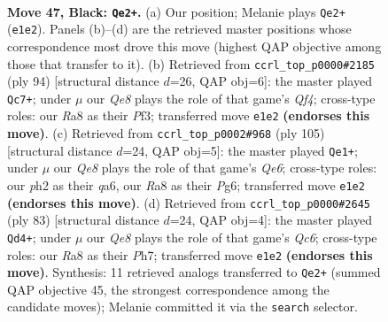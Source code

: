 \documentclass[11pt]{article}
\begin{document}
\clearpage

\begin{figure}[p]\centering
\begin{subfigure}{0.46\textwidth}\centering
\resizebox{\linewidth}{!}{%
\newchessgame
\chessboard[
  setfen={r7/1Q6/4kp2/3p4/5P2/p5P1/P5KP/4q3 b - - 14 47},
  showmover=false,
  pgfstyle=straightmove, color=movearrow, markmove={e1-e2}
]}
\caption{}
\end{subfigure}\hfill
\begin{subfigure}{0.46\textwidth}\centering
\resizebox{\linewidth}{!}{%
\newchessgame
\chessboard[
  setfen={8/4kpp1/4p2p/7P/3P1Q2/3K1P2/6q1/8 w - - 14 48},
  showmover=false,
  pgfstyle=straightmove, color=movearrow, markmove={f4-c7}
]}
\caption{}
\end{subfigure}
\\[4pt]
\begin{subfigure}{0.46\textwidth}\centering
\resizebox{\linewidth}{!}{%
\newchessgame
\chessboard[
  setfen={8/4k3/Q1p2ppp/8/1P6/P3q2P/6P1/7K b - - 8 53},
  showmover=false,
  pgfstyle=straightmove, color=movearrow, markmove={e3-e1}
]}
\caption{}
\end{subfigure}\hfill
\begin{subfigure}{0.46\textwidth}\centering
\resizebox{\linewidth}{!}{%
\newchessgame
\chessboard[
  setfen={6Q1/7p/7k/5p2/5P2/1pq3P1/4PK2/8 b - - 0 42},
  showmover=false,
  pgfstyle=straightmove, color=movearrow, markmove={c3-d4}
]}
\caption{}
\end{subfigure}
\caption{\textbf{Move 47, Black: \texttt{Qe2+}.} (a) Our position; Melanie plays \texttt{Qe2+} (\texttt{e1e2}). Panels (b)--(d) are the retrieved master positions whose correspondence most drove this move (highest QAP objective among those that transfer to it). (b) Retrieved from \texttt{ccrl\_top\_p0000\#2185} (ply 94) [structural distance $d$=26, QAP obj=6]: the master played \texttt{Qc7+}; under $\mu$ our \emph{Qe8} plays the role of that game's \emph{Qf4}; cross-type roles: our \emph{R}a8 as their \emph{P}f3; transferred move \texttt{e1e2} \textbf{(endorses this move)}. (c) Retrieved from \texttt{ccrl\_top\_p0002\#968} (ply 105) [structural distance $d$=24, QAP obj=5]: the master played \texttt{Qe1+}; under $\mu$ our \emph{Qe8} plays the role of that game's \emph{Qe6}; cross-type roles: our \emph{p}h2 as their \emph{q}a6, our \emph{R}a8 as their \emph{P}g6; transferred move \texttt{e1e2} \textbf{(endorses this move)}. (d) Retrieved from \texttt{ccrl\_top\_p0000\#2645} (ply 83) [structural distance $d$=24, QAP obj=4]: the master played \texttt{Qd4+}; under $\mu$ our \emph{Qe8} plays the role of that game's \emph{Qc6}; cross-type roles: our \emph{R}a8 as their \emph{P}h7; transferred move \texttt{e1e2} \textbf{(endorses this move)}. Synthesis: 11 retrieved analogs transferred to \texttt{Qe2+} (summed QAP objective 45, the strongest correspondence among the candidate moves); Melanie committed it via the \texttt{search} selector.}
\label{fig:thought-m93}
\end{figure}
\end{document}

